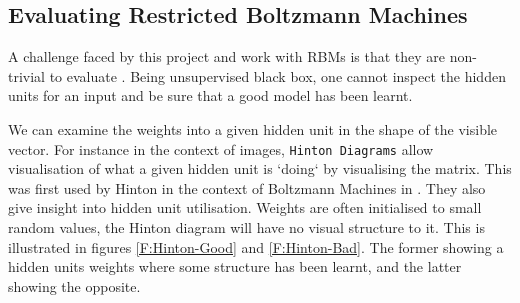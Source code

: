     \subsection{Evaluating Restricted Boltzmann Machines}
    A challenge faced by this project and work with RBMs is that they are non-trivial to evaluate . Being unsupervised black box, one cannot inspect the hidden units for an input and be sure that a good model has been learnt.

    We can examine the weights into a given hidden unit in the shape of the visible vector. For instance in the context of images, \texttt{Hinton Diagrams} allow visualisation of what a given hidden unit is `doing` by visualising the matrix. This was first used by Hinton in the context of Boltzmann Machines in \cite{Hinton:1986:LRB:104279.104291}. They also give insight into hidden unit utilisation.  Weights are often initialised to small random values, the Hinton diagram will have no visual structure to it. This is illustrated in figures \ref{F:Hinton-Good} and \ref{F:Hinton-Bad}. The former showing a hidden units weights where some structure has been learnt, and the latter showing the opposite.

